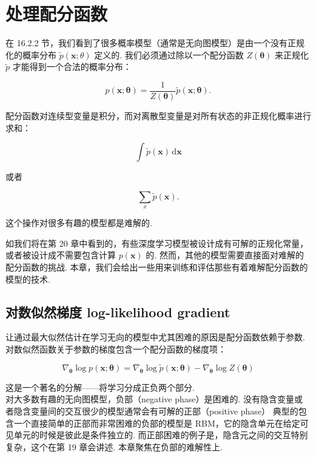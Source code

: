 \chapter{处理配分函数}
\label{ch:partition}

在 16.2.2 节，我们看到了很多概率模型（通常是无向图模型）是由一个没有正规化的概率分布 $\tilde{p}(\mathbf{x};\theta)$ 定义的. 我们必须通过除以一个配分函数 $Z(\pmb{\theta})$ 来正规化 $\tilde{p}$ 才能得到一个合法的概率分布：

\begin{equation}  \label{eq:pyth}
p(\mathbf{x};\pmb{\theta}) = \frac{1}{Z(\pmb{\theta})} \tilde{p}(\mathbf{x}; \pmb{\theta}).
\end{equation}

配分函数对连续型变量是积分，而对离散型变量是对所有状态的非正规化概率进行求和：

\begin{equation}  \label{eq:pyth}
\int \!\tilde{p}(\pmb{x})\, \mathrm{d}\pmb{x}
\end{equation}

或者

\begin{equation}  \label{eq:pyth}
\sum_{x} \tilde{p}(\pmb{x}).
\end{equation}

这个操作对很多有趣的模型都是难解的. 

如我们将在第 20 章中看到的，有些深度学习模型被设计成有可解的正规化常量，或者被设计成不需要包含计算 $p(\mathbf{x})$ 的. 然而，其他的模型需要直接面对难解的配分函数的挑战. 本章，我们会给出一些用来训练和评估那些有着难解配分函数的模型的技术. 

\section{对数似然梯度 log-likelihood gradient}
\label{sec:llg}

让通过最大似然估计在学习无向的模型中尤其困难的原因是配分函数依赖于参数. 对数似然函数关于参数的梯度包含一个配分函数的梯度项：

\begin{equation}  \label{eq:pyth}
\nabla_{\pmb{\theta}} \log p(\mathbf{x};\pmb{\theta}) = \nabla_{\pmb{\theta}} \log \tilde{p}(\mathbf{x};\pmb{\theta}) - \nabla_{\pmb{\theta}} \log Z(\pmb{\theta})
\end{equation}

这是一个著名的分解——将学习分成正负两个部分.\\

对大多数有趣的无向图模型，负部（negative phase）是困难的. 没有隐含变量或者隐含变量间的交互很少的模型通常会有可解的正部（positive phase） 典型的包含一个直接简单的正部而非常困难的负部的模型是 RBM，它的隐含单元在给定可见单元的时候是彼此是条件独立的. 而正部困难的例子是，隐含元之间的交互特别复杂，这个在第 19 章会讲述. 本章聚焦在负部的难解性上.\\

